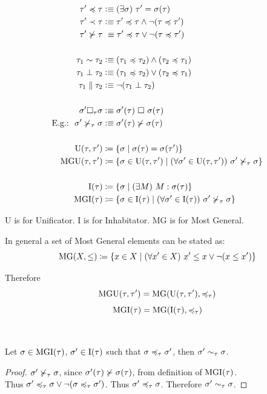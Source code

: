\documentclass[a4paper,oneside]{memoir}
\begin{document}
\begin{definition}
\begin{align*}
\tauPr \tord  \tau   &\defe \E{\sigma}{\tauPr = \sigma(\tau)} \\
\tauPr \stord \tau   &\defe \tauPr \tord \tau \wedge \neg (\tau \tord \tauPr) \\
\tauPr \nsucc \tau &\ \equiv \tauPr \tord \tau \vee  \neg ( \tau \tord \tauPr)   \\   
\\
\tau_1 \tek      \tau_2  &\defe  (\tau_1 \tord \tau_2) \wedge (\tau_2 \tord \tau_1) \\
\tau_1 \perp     \tau_2  &\defe  (\tau_1 \tord \tau_2) \vee (\tau_2 \tord \tau_1) \\
\tau_1 \parallel \tau_2  &\defe  \neg (\tau_1 \perp  \tau_2) \\
\\
\sigmaPr \square_\tau \sigma   &\defe   \sigmaPr(\tau)\ \square\ \sigma(\tau)\\
\text{E.g.:~~} \sigmaPr \nsucct \sigma  &\defe  \sigmaPr(\tau) \nsucc \sigma(\tau)\\
\\
\Utt &\defi \{ \s \mid \s(\tau) = \s(\tauPr) \}\\
\MGUtt &\defi \{ \s \in \Utt \mid \A{\sPr \in \Utt}{\sPr \nsucct \s}  \}\\
\\
\It &\defi \{ \sigma \mid \E{M}{M : \sigma(\tau)}  \} \\
\MGI{\tau} &\defi \{ \sigma \in \It \mid \Ain{\sigmaPr}{\It}{\sigmaPr \nsucct \sigma}  \}\\
\end{align*}
\end{definition}


U is for Unificator. I is for Inhabitator. MG is for Most General. 

In general a set of Most General elements can be stated as:
$$\op{MG}(X,\leq) \defi \{ x \in X \mid \Ain{\xPr}{X}{\xPr \leq x \vee \neg(x \leq \xPr)} \}$$

Therefore 
$$\MGUtt = \op{MG}(\Utt,\ordt)$$
$$\MGIt  = \op{MG}(\It, \ordt)$$

~

\begin{lemma}
Let $\sigma \in \MGIt$, $\sigmaPr \in \It$ such that $\sigma \ordt \sigmaPr$,
then $\sigmaPr \ekt \sigma$.
\end{lemma}
\begin{proof}
$\sigmaPr \nsucct \sigma$, since $\sigmaPr(\tau) \nsucc \sigma(\tau)$, from definition of $\MGIt$.\\
Thus $\sigmaPr \ordt \sigma \vee \neg( \sigma \ordt \sigmaPr )$.
Thus $\sigmaPr \ordt \sigma$.
Therefore $\sigmaPr \ekt \sigma$.
\end{proof}
\end{document}
